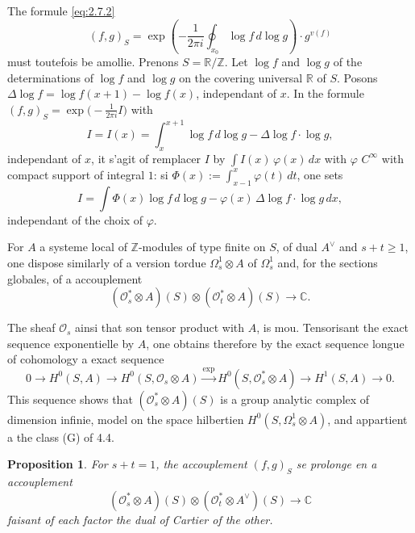 \documentclass[12pt,a4paper]{article}
\theoremstyle{plain}
\newtheorem{proposition}[theorem]{Proposition}
\theoremstyle{definition}
\theoremstyle{remark}
\newcommand{\cO}{\mathcal{O}}
\newcommand{\Z}{\mathbb{Z}}
\newcommand{\C}{\mathbb{C}}
\newcommand{\R}{\mathbb{R}}
\providecommand{\cO}{\mathcal{O}}
\providecommand{\R}{\mathrm{R}}
\begin{document}
The formule \eqref{eq:2.7.2}
\[
(f,g)_S = \exp\left(-\frac{1}{2\pi i} \oint_{x_0} \log f \, d\log g\right) \cdot g^{v(f)}
\]
must toutefois be amollie. Prenons $S = \R/\Z$. Let $\log f$ and $\log g$ of the determinations of
$\log f$ and $\log g$ on the covering universal $\R$ of $S$. Posons $\Delta \log f = \log f(x+1) - \log f(x)$,
independant of $x$. In the formule $(f,g)_S = \exp\bigl(-\tfrac{1}{2\pi i} I\bigr)$ with
\[
I = I(x) = \int_x^{x+1} \log f \, d\log g - \Delta \log f \cdot \log g,
\]
independant of $x$, it s'agit of remplacer $I$ by $\int I(x) \, \varphi(x) \, dx$ with $\varphi$ $C^\infty$ with compact support
of integral $1$: si $\Phi(x) := \int_{x-1}^x \varphi(t) \, dt$, one sets
\[
I = \int \Phi(x) \log f \, d\log g - \varphi(x) \, \Delta \log f \cdot \log g \, dx,
\]
independant of the choix of $\varphi$.

For $A$ a systeme local of $\Z$-modules of type finite on $S$, of dual $A^\vee$ and $s + t \geq 1$,
one dispose similarly of a version tordue $\Omega^1_s \otimes A$ of $\Omega^1_s$ and, for the sections globales,
of a accouplement
\[
(\cO_s^* \otimes A)(S) \otimes (\cO_t^* \otimes A)(S) \to \C.
\]

The sheaf $\cO_s$ ainsi that son tensor product with $A$, is mou. Tensorisant the exact sequence exponentielle by $A$, one obtains therefore by the exact sequence longue of cohomology
a exact sequence
\[
0 \to H^0(S, A) \to H^0(S, \cO_s \otimes A) \xrightarrow{\exp} H^0(S, \cO_s^* \otimes A) \to H^1(S, A) \to 0.
\]
This sequence shows that $(\cO_s^* \otimes A)(S)$ is a group analytic complex of dimension
infinie, model on the space hilbertien $H^0(S, \Omega_s^1 \otimes A)$, and appartient a the class (G) of 4.4.

\begin{proposition}
For $s + t = 1$, the accouplement $(f,g)_S$ se prolonge en a accouplement
\[
(\cO_s^* \otimes A)(S) \otimes (\cO_t^* \otimes A^\vee)(S) \to \C
\]
faisant of each factor the dual of Cartier of the other.
\end{proposition}
\end{document}
